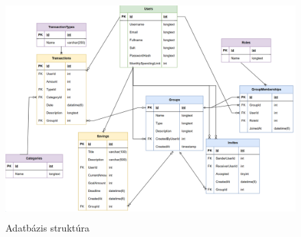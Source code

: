 \begin{figure}[H]
	\centering
	\includegraphics[height=320px]{img/0000}
	\caption{Adatbázis struktúra}
	\label{fig:database-structure}
\end{figure}

